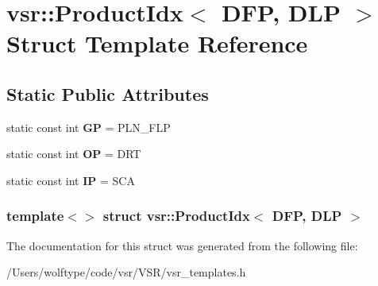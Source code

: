 \hypertarget{structvsr_1_1_product_idx_3_01_d_f_p_00_01_d_l_p_01_4}{\section{vsr\-:\-:Product\-Idx$<$ D\-F\-P, D\-L\-P $>$ Struct Template Reference}
\label{structvsr_1_1_product_idx_3_01_d_f_p_00_01_d_l_p_01_4}
}
\subsection*{Static Public Attributes}
\begin{DoxyCompactItemize}
\item 
\hypertarget{structvsr_1_1_product_idx_3_01_d_f_p_00_01_d_l_p_01_4_acb9c1ca9f1d77a9e3dbd88d7d49af948}{static const int {\bfseries G\-P} = P\-L\-N\-\_\-\-F\-L\-P}\label{structvsr_1_1_product_idx_3_01_d_f_p_00_01_d_l_p_01_4_acb9c1ca9f1d77a9e3dbd88d7d49af948}

\item 
\hypertarget{structvsr_1_1_product_idx_3_01_d_f_p_00_01_d_l_p_01_4_ad7f8530db1d490e215e2b8f74ee04c52}{static const int {\bfseries O\-P} = D\-R\-T}\label{structvsr_1_1_product_idx_3_01_d_f_p_00_01_d_l_p_01_4_ad7f8530db1d490e215e2b8f74ee04c52}

\item 
\hypertarget{structvsr_1_1_product_idx_3_01_d_f_p_00_01_d_l_p_01_4_a8be87ccb9802426d4eeefce532a82e95}{static const int {\bfseries I\-P} = S\-C\-A}\label{structvsr_1_1_product_idx_3_01_d_f_p_00_01_d_l_p_01_4_a8be87ccb9802426d4eeefce532a82e95}

\end{DoxyCompactItemize}
\subsubsection*{template$<$$>$ struct vsr\-::\-Product\-Idx$<$ D\-F\-P, D\-L\-P $>$}



The documentation for this struct was generated from the following file\-:\begin{DoxyCompactItemize}
\item 
/\-Users/wolftype/code/vsr/\-V\-S\-R/vsr\-\_\-templates.\-h\end{DoxyCompactItemize}
